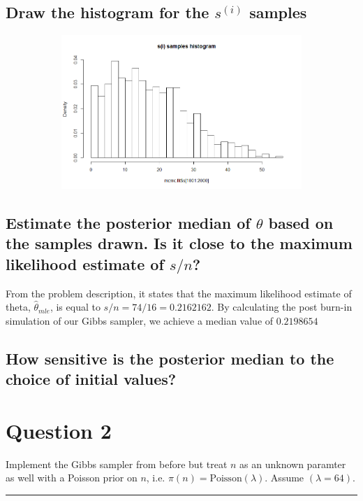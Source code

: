\documentclass[20pt]{article} %
\begin{document}
\subsection{Draw the histogram for the $s^{(i)}$ samples}
\begin{figure}[!htbp]
  	\centering
   	\begin{subfigure}[p]{0.9\linewidth}
    	\includegraphics[width=\linewidth]{./figures/hw3-03.png}
   	\end{subfigure}
\end{figure} 
\subsection{Estimate the posterior median of $\theta$ based on the samples drawn. Is it close to the maximum likelihood estimate of $s/n$?}
From the problem description, it states that the maximum likelihood estimate of theta, $\hat{\theta}_{mle}$, is equal to $s/n = 74/16 = 0.2162162$.  By calculating the post burn-in simulation of our Gibbs sampler, we achieve a median value of $0.2198654$
\subsection{How sensitive is the posterior median to the choice of initial values?}

\section{Question 2}
Implement the Gibbs sampler from before but treat $n$ as an unknown paramter as well with a Poisson prior on $n$, i.e. $\pi(n) = \text{Poisson}(\lambda)$.  Assume $(\lambda = 64)$.
\\ \noindent\rule{2cm}{0.4pt} \\
\end{document}
